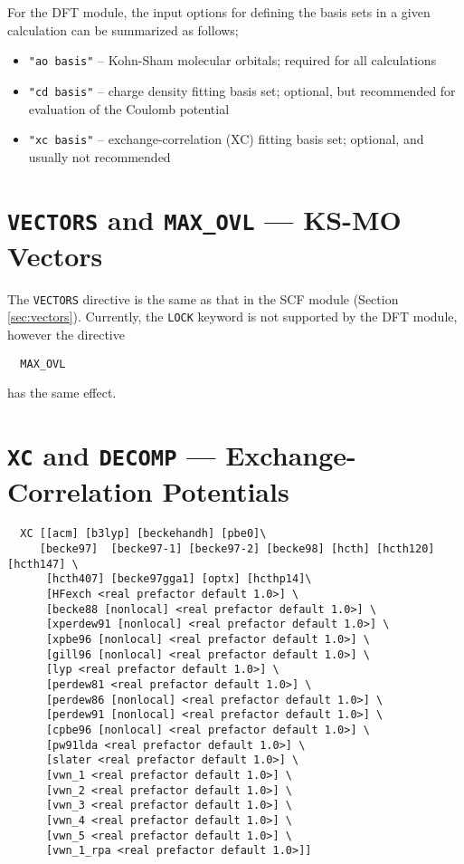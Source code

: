 For the DFT module, the input options for defining the basis sets in a given
calculation can be summarized as follows;
\begin{itemize}
\item {\tt "ao basis"} -- Kohn-Sham molecular orbitals; required for all 
calculations
\item {\tt "cd basis"} -- charge density fitting basis set; optional, but
recommended for evaluation of the Coulomb potential
\item {\tt "xc basis"} -- exchange-correlation (XC) fitting basis set; 
optional, and usually not recommended
\end{itemize}


\section{{\tt VECTORS} and {\tt MAX\_OVL} --- KS-MO Vectors}

The \verb+VECTORS+ directive is the same as that in the SCF module
(Section \ref{sec:vectors}).  Currently, the \verb+LOCK+ keyword
is not supported by the DFT module, however the directive
\begin{verbatim}
  MAX_OVL
\end{verbatim}
has the same effect.

\section{{\tt XC} and {\tt DECOMP} --- Exchange-Correlation Potentials}
\label{sec:xc}
\begin{verbatim}
  XC [[acm] [b3lyp] [beckehandh] [pbe0]\
     [becke97]  [becke97-1] [becke97-2] [becke98] [hcth] [hcth120] [hcth147] \
      [hcth407] [becke97gga1] [optx] [hcthp14]\
      [HFexch <real prefactor default 1.0>] \
      [becke88 [nonlocal] <real prefactor default 1.0>] \
      [xperdew91 [nonlocal] <real prefactor default 1.0>] \
      [xpbe96 [nonlocal] <real prefactor default 1.0>] \
      [gill96 [nonlocal] <real prefactor default 1.0>] \
      [lyp <real prefactor default 1.0>] \
      [perdew81 <real prefactor default 1.0>] \
      [perdew86 [nonlocal] <real prefactor default 1.0>] \
      [perdew91 [nonlocal] <real prefactor default 1.0>] \
      [cpbe96 [nonlocal] <real prefactor default 1.0>] \
      [pw91lda <real prefactor default 1.0>] \
      [slater <real prefactor default 1.0>] \
      [vwn_1 <real prefactor default 1.0>] \
      [vwn_2 <real prefactor default 1.0>] \
      [vwn_3 <real prefactor default 1.0>] \
      [vwn_4 <real prefactor default 1.0>] \
      [vwn_5 <real prefactor default 1.0>] \
      [vwn_1_rpa <real prefactor default 1.0>]]
\end{verbatim}

